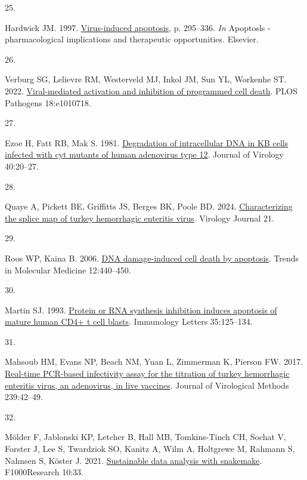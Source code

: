 \documentclass[
]{article}
\newlength{\cslhangindent}
\newlength{\csllabelwidth}
\newenvironment{CSLReferences}[2] %
 {\begin{list}{}{%
  \setlength{\itemindent}{0pt}
  \setlength{\leftmargin}{0pt}
  \setlength{\parsep}{0pt}
  \ifodd #1
   \setlength{\leftmargin}{\cslhangindent}
   \setlength{\itemindent}{-1\cslhangindent}
  \fi
  \setlength{\itemsep}{#2\baselineskip}}}
 {\end{list}}
\newcommand{\CSLLeftMargin}[1]{\parbox[t]{\csllabelwidth}{\strut#1\strut}}
\newcommand{\CSLRightInline}[1]{\parbox[t]{\linewidth - \csllabelwidth}{\strut#1\strut}}
\begin{document}
\begin{CSLReferences}{0}{1}
\CSLLeftMargin{25. }%
\CSLRightInline{Hardwick JM. 1997.
\href{https://doi.org/10.1016/s1054-3589(08)61063-7}{Virus-induced
apoptosis}, p. 295--336. \emph{In} Apoptosls - pharmacological
implications and therapeutic opportunities. Elsevier.}

\CSLLeftMargin{26. }%
\CSLRightInline{Verburg SG, Lelievre RM, Westerveld MJ, Inkol JM, Sun
YL, Workenhe ST. 2022.
\href{https://doi.org/10.1371/journal.ppat.1010718}{Viral-mediated
activation and inhibition of programmed cell death}. PLOS Pathogens
18:e1010718.}

\CSLLeftMargin{27. }%
\CSLRightInline{Ezoe H, Fatt RB, Mak S. 1981.
\href{https://doi.org/10.1128/jvi.40.1.20-27.1981}{Degradation of
intracellular DNA in KB cells infected with cyt mutants of human
adenovirus type 12}. Journal of Virology 40:20--27.}

\CSLLeftMargin{28. }%
\CSLRightInline{Quaye A, Pickett BE, Griffitts JS, Berges BK, Poole BD.
2024. \href{https://doi.org/10.1186/s12985-024-02449-0}{Characterizing
the splice map of turkey hemorrhagic enteritis virus}. Virology Journal
21.}

\CSLLeftMargin{29. }%
\CSLRightInline{Roos WP, Kaina B. 2006.
\href{https://doi.org/10.1016/j.molmed.2006.07.007}{DNA damage-induced
cell death by apoptosis}. Trends in Molecular Medicine 12:440--450.}

\CSLLeftMargin{30. }%
\CSLRightInline{Martin SJ. 1993.
\href{https://doi.org/10.1016/0165-2478(93)90080-l}{Protein or RNA
synthesis inhibition induces apoptosis of mature human CD4+ t cell
blasts}. Immunology Letters 35:125--134.}

\CSLLeftMargin{31. }%
\CSLRightInline{Mahsoub HM, Evans NP, Beach NM, Yuan L, Zimmerman K,
Pierson FW. 2017.
\href{https://doi.org/10.1016/j.jviromet.2016.11.002}{Real-time
{PCR}-based infectivity assay for the titration of turkey hemorrhagic
enteritis virus, an adenovirus, in live vaccines}. Journal of
Virological Methods 239:42--49.}

\CSLLeftMargin{32. }%
\CSLRightInline{Mölder F, Jablonski KP, Letcher B, Hall MB,
Tomkins-Tinch CH, Sochat V, Forster J, Lee S, Twardziok SO, Kanitz A,
Wilm A, Holtgrewe M, Rahmann S, Nahnsen S, Köster J. 2021.
\href{https://doi.org/10.12688/f1000research.29032.2}{Sustainable data
analysis with snakemake}. F1000Research 10:33.}


\end{CSLReferences}
\end{document}
